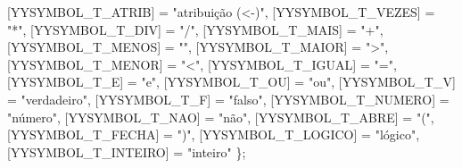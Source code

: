 \documentclass[
  brazilian,
  letterpaper,
]{book}
\newenvironment{Shaded}{\begin{snugshade}}{\end{snugshade}}
\newcommand{\NormalTok}[1]{\textcolor[rgb]{0.00,0.23,0.31}{#1}}
\newcommand{\OperatorTok}[1]{\textcolor[rgb]{0.37,0.37,0.37}{#1}}
\newcommand{\StringTok}[1]{\textcolor[rgb]{0.13,0.47,0.30}{#1}}
\theoremstyle{plain}
\theoremstyle{definition}
\theoremstyle{remark}
\begin{document}
\begin{Shaded}
\begin{Highlighting}[]
        \OperatorTok{[}\NormalTok{YYSYMBOL\_T\_ATRIB}\OperatorTok{]}     \OperatorTok{=} \StringTok{"atribuição (\textless{}{-})"}\OperatorTok{,}
        \OperatorTok{[}\NormalTok{YYSYMBOL\_T\_VEZES}\OperatorTok{]}     \OperatorTok{=} \StringTok{"\textquotesingle{}*\textquotesingle{}"}\OperatorTok{,}
        \OperatorTok{[}\NormalTok{YYSYMBOL\_T\_DIV}\OperatorTok{]}       \OperatorTok{=} \StringTok{"\textquotesingle{}/\textquotesingle{}"}\OperatorTok{,}
        \OperatorTok{[}\NormalTok{YYSYMBOL\_T\_MAIS}\OperatorTok{]}      \OperatorTok{=} \StringTok{"\textquotesingle{}+\textquotesingle{}"}\OperatorTok{,}
        \OperatorTok{[}\NormalTok{YYSYMBOL\_T\_MENOS}\OperatorTok{]}     \OperatorTok{=} \StringTok{"\textquotesingle{}{-}\textquotesingle{}"}\OperatorTok{,}
        \OperatorTok{[}\NormalTok{YYSYMBOL\_T\_MAIOR}\OperatorTok{]}     \OperatorTok{=} \StringTok{"\textquotesingle{}\textgreater{}\textquotesingle{}"}\OperatorTok{,}
        \OperatorTok{[}\NormalTok{YYSYMBOL\_T\_MENOR}\OperatorTok{]}     \OperatorTok{=} \StringTok{"\textquotesingle{}\textless{}\textquotesingle{}"}\OperatorTok{,}
        \OperatorTok{[}\NormalTok{YYSYMBOL\_T\_IGUAL}\OperatorTok{]}     \OperatorTok{=} \StringTok{"\textquotesingle{}=\textquotesingle{}"}\OperatorTok{,}
        \OperatorTok{[}\NormalTok{YYSYMBOL\_T\_E}\OperatorTok{]}         \OperatorTok{=} \StringTok{"e"}\OperatorTok{,}
        \OperatorTok{[}\NormalTok{YYSYMBOL\_T\_OU}\OperatorTok{]}        \OperatorTok{=} \StringTok{"ou"}\OperatorTok{,}
        \OperatorTok{[}\NormalTok{YYSYMBOL\_T\_V}\OperatorTok{]}         \OperatorTok{=} \StringTok{"verdadeiro"}\OperatorTok{,}
        \OperatorTok{[}\NormalTok{YYSYMBOL\_T\_F}\OperatorTok{]}         \OperatorTok{=} \StringTok{"falso"}\OperatorTok{,}
        \OperatorTok{[}\NormalTok{YYSYMBOL\_T\_NUMERO}\OperatorTok{]}    \OperatorTok{=} \StringTok{"número"}\OperatorTok{,}
        \OperatorTok{[}\NormalTok{YYSYMBOL\_T\_NAO}\OperatorTok{]}       \OperatorTok{=} \StringTok{"não"}\OperatorTok{,}
        \OperatorTok{[}\NormalTok{YYSYMBOL\_T\_ABRE}\OperatorTok{]}      \OperatorTok{=} \StringTok{"\textquotesingle{}(\textquotesingle{}"}\OperatorTok{,}
        \OperatorTok{[}\NormalTok{YYSYMBOL\_T\_FECHA}\OperatorTok{]}     \OperatorTok{=} \StringTok{"\textquotesingle{})\textquotesingle{}"}\OperatorTok{,}
        \OperatorTok{[}\NormalTok{YYSYMBOL\_T\_LOGICO}\OperatorTok{]}    \OperatorTok{=} \StringTok{"lógico"}\OperatorTok{,}
        \OperatorTok{[}\NormalTok{YYSYMBOL\_T\_INTEIRO}\OperatorTok{]}   \OperatorTok{=} \StringTok{"inteiro"}
    \OperatorTok{\};}


\end{Highlighting}
\end{Shaded}
\end{document}

